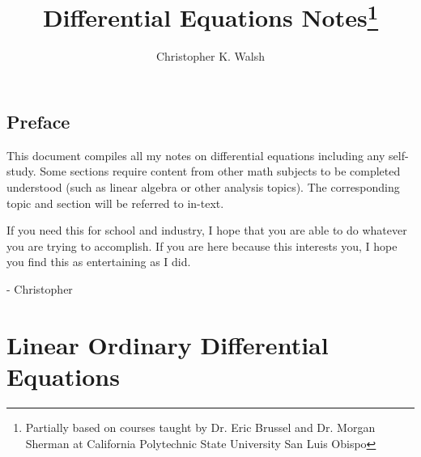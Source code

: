 \documentclass[12pt,openany]{book}
\title{Differential Equations Notes\thanks{Partially based on courses taught by Dr. Eric Brussel and Dr. Morgan Sherman at California Polytechnic State University San Luis Obispo}}
\author{Christopher K. Walsh}
\date{ }
\theoremstyle{mydefinitionstyle}
\theoremstyle{myexamplestyle}
\theoremstyle{remark}
\begin{document}
\maketitle
\tableofcontents

\newpage
\section*{Preface}
This document compiles all my notes on differential equations including any self-study.
Some sections require content from other math subjects to be completed understood (such as linear algebra or other analysis topics).
The corresponding topic and section will be referred to in-text.

If you need this for school and industry, I hope that you are able to do whatever you are trying to accomplish.
If you are here because this interests you, I hope you find this as entertaining as I did.

- Christopher

\chapter{Linear Ordinary Differential Equations}

\end{document}
